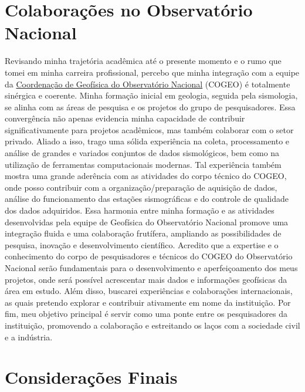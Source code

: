 \documentclass[10pt,a4paper,oneside]{book}
\begin{document}

\chapter{Colaborações no Observatório Nacional}
\label{cap_colab}

Revisando minha trajetória acadêmica até o presente momento e o rumo que tomei em minha carreira profissional, percebo que minha integração com a equipe da \href{https://www.gov.br/observatorio/pt-br/assuntos/areas-de-atuacao/geofisica}{Coordenação de Geofísica do Observatório Nacional} (COGEO) é totalmente sinérgica e coerente. Minha formação inicial em geologia, seguida pela sismologia, se alinha com as áreas de pesquisa e os projetos do grupo de pesquisadores. Essa convergência não apenas evidencia minha capacidade de contribuir significativamente para projetos acadêmicos, mas também colaborar com o setor privado. Aliado a isso, trago uma sólida experiência na coleta, processamento e análise de grandes e variados conjuntos de dados sismológicos, bem como na utilização de ferramentas computacionais modernas. Tal experiência também mostra uma grande aderência com as atividades do corpo técnico do COGEO, onde posso contribuir com a organização/preparação de aquisição de dados, análise do funcionamento das estações sismográficas e do controle de qualidade dos dados adquiridos. Essa harmonia entre minha formação e as atividades desenvolvidas pela equipe de Geofísica do Observatório Nacional promove uma integração fluida e uma colaboração frutífera, ampliando as possibilidades de pesquisa, inovação e desenvolvimento científico. Acredito que a expertise e o conhecimento do corpo de pesquisadores e técnicos do COGEO do Observatório Nacional serão fundamentais para o desenvolvimento e aperfeiçoamento dos meus projetos, onde será possível acrescentar mais dados e informações geofísicas da área em estudo. Além disso, buscarei experiências e colaborações internacionais, as quais pretendo explorar e contribuir ativamente em nome da instituição. Por fim, meu objetivo principal é servir como uma ponte entre os pesquisadores da instituição, promovendo a colaboração e estreitando os laços com a sociedade civil e a indústria.


\chapter{Considerações Finais}
\label{cap_conclusao}
\end{document}
